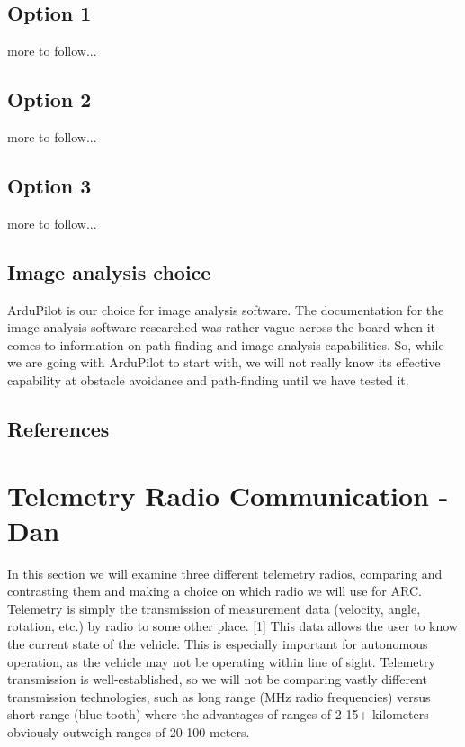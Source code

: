 \documentclass[compsoc,draftclsnofoot,onecolumn,10pt]{IEEEtran}
\begin{document}
\subsection{Option 1}
more to follow...

\subsection{Option 2}
more to follow...

\subsection{Option 3}
more to follow...

\subsection{Image analysis choice}
ArduPilot is our choice for image analysis software. The documentation for the
image analysis software researched was rather vague across the board when it
comes to information on path-finding and image analysis capabilities. So, while
we are going with ArduPilot to start with, we will not really know its effective
capability at obstacle avoidance and path-finding until we have tested it.

\subsection{References}

\newpage

\section{Telemetry Radio Communication - Dan}
In this section we will examine three different telemetry radios, comparing and
contrasting them and making a choice on which radio we will use for ARC.
Telemetry is simply the transmission of measurement data (velocity, angle,
rotation, etc.) by radio to some other place. [1] This data allows the user to know the current state of the vehicle. This is especially
important for autonomous operation, as the vehicle may not be operating within
line of sight. Telemetry transmission is
well-established, so we will not be comparing vastly different transmission
technologies, such as long range (MHz radio frequencies) versus short-range
(blue-tooth) where the advantages of ranges of 2-15+ kilometers obviously
outweigh ranges of 20-100 meters.
\end{document}
